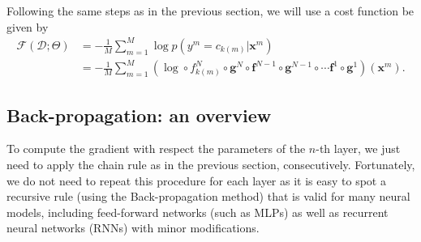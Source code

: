 Following the same steps as in the previous section, we will use a cost function be given by %
\begin{align}
\mathcal{F}(\mathcal{D};\Theta) & = -\frac{1}{M}\sum_{m=1}^{M} \log p(y^m=c_{k(m)} | \mathbf{x}^m)\nonumber\\ & = -\frac{1}{M}\sum_{m=1}^{M} (\log \circ f_{k(m)}^N \circ \mathbf{g}^N \circ \mathbf{f}^{N-1} \circ \mathbf{g}^{N-1} \circ \cdots \mathbf{f}^1 \circ \mathbf{g}^1)(\mathbf{x}^m).
\end{align}

\subsection{Back-propagation: an overview}
To compute the gradient with respect the parameters of the $n$-th layer, we just need to apply the chain rule as in the previous section, consecutively. 
Fortunately, we
do not need to repeat this procedure for each layer as it is easy to spot a recursive
rule (using the Back-propagation method) that is valid for many neural models, including feed-forward networks (such as MLPs) as well as recurrent neural networks (RNNs) with minor modifications.  

